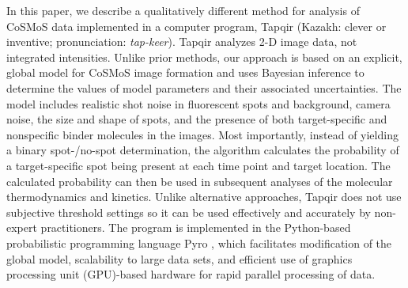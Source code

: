 In this paper, we describe a qualitatively different method for analysis of CoSMoS data implemented in a computer program, Tapqir (Kazakh: clever or inventive; pronunciation: \emph{tap-keer}). Tapqir analyzes 2-D image data, not integrated intensities.  Unlike prior methods, our approach is based on an explicit, global model for CoSMoS image formation and uses Bayesian inference to determine the values of model parameters and their associated uncertainties. The model includes realistic shot noise in fluorescent spots and background, camera noise, the size and shape of spots, and the presence of both target-specific and nonspecific binder molecules in the images. Most importantly, instead of yielding a binary spot-/no-spot determination, the algorithm calculates the probability of a target-specific spot being present at each time point and target location. The calculated probability can then be used in subsequent analyses of the molecular thermodynamics and kinetics. Unlike alternative approaches, Tapqir does not use subjective threshold settings so it can be used effectively and accurately by non-expert practitioners. The program is implemented in the Python-based probabilistic programming language Pyro \cite{Bingham2019-qy}, which facilitates modification of the global model, scalability to large data sets, and efficient use of graphics processing unit (GPU)-based hardware for rapid parallel processing of data. 